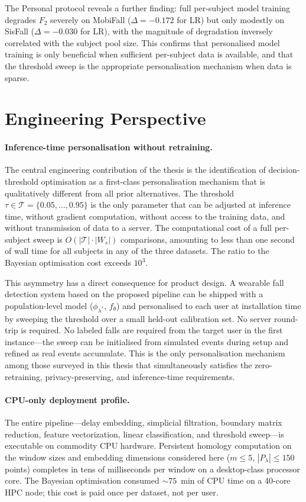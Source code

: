 The Personal protocol reveals a further finding: full per-subject model training
degrades $F_2$ severely on MobiFall ($\Delta = -0.172$ for LR) but only modestly on
SisFall ($\Delta = -0.030$ for LR), with the magnitude of degradation inversely
correlated with the subject pool size.  This confirms that personalised model
training is only beneficial when sufficient per-subject data is available, and that
the threshold sweep is the appropriate personalisation mechanism when data is sparse.

\section{Engineering Perspective}
\label{subsec:conclusion-eng}

\paragraph{Inference-time personalisation without retraining.}
The central engineering contribution of the thesis is the identification of
decision-threshold optimisation as a first-class personalisation mechanism that
is qualitatively different from all prior alternatives.  The threshold
$\tau\in\mathcal{T}=\{0.05,\ldots,0.95\}$ is the only parameter that can be
adjusted at inference time, without gradient computation, without access to the
training data, and without transmission of data to a server.  The computational
cost of a full per-subject sweep is $O(|\mathcal{T}|\cdot|W_s|)$ comparisons,
amounting to less than one second of wall time for all subjects in any of the three
datasets.  The ratio to the Bayesian optimisation cost exceeds $10^3$.

This asymmetry has a direct consequence for product design.  A wearable fall
detection system based on the proposed pipeline can be shipped with a population-level
model ($\phi_{\lambda^*}$, $f_\theta$) and personalised to each user at installation
time by sweeping the threshold over a small held-out calibration set.  No server
round-trip is required.  No labeled falls are required from the target user in the
first instance---the sweep can be initialised from simulated events during setup and
refined as real events accumulate.  This is the only personalisation mechanism among
those surveyed in this thesis that simultaneously satisfies the zero-retraining,
privacy-preserving, and inference-time requirements.

\paragraph{CPU-only deployment profile.}
The entire pipeline---delay embedding, simplicial filtration, boundary matrix
reduction, feature vectorization, linear classification, and threshold sweep---is
executable on commodity CPU hardware.  Persistent homology computation on the
window sizes and embedding dimensions considered here ($m \leq 5$,
$|P_\lambda| \leq 150$ points) completes in tens of milliseconds per window on a
desktop-class processor core.  The Bayesian optimisation consumed ${\sim}75$~min
of CPU time on a 40-core HPC node; this cost is paid once per dataset, not per
user.

